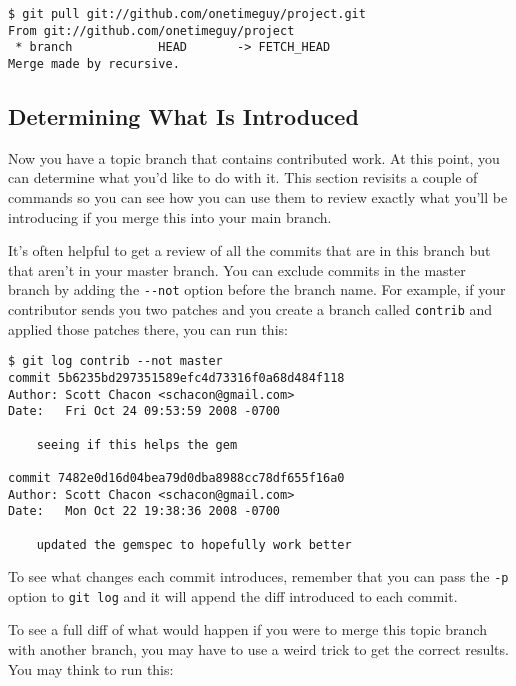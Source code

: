 \documentclass[a4paper]{book}
\begin{document}
\begin{shaded}\begin{verbatim}
$ git pull git://github.com/onetimeguy/project.git
From git://github.com/onetimeguy/project
 * branch            HEAD       -> FETCH_HEAD
Merge made by recursive.
\end{verbatim}\end{shaded}

\subsection{Determining What Is Introduced}

Now you have a topic branch that contains contributed work. At this point, you can determine what you'd like to do with it. This section revisits a couple of commands so you can see how you can use them to review exactly what you'll be introducing if you merge this into your main branch.

It's often helpful to get a review of all the commits that are in this branch but that aren't in your master branch. You can exclude commits in the master branch by adding the \texttt{-{}-not} option before the branch name. For example, if your contributor sends you two patches and you create a branch called \texttt{contrib} and applied those patches there, you can run this:

\begin{shaded}\begin{verbatim}
$ git log contrib --not master
commit 5b6235bd297351589efc4d73316f0a68d484f118
Author: Scott Chacon <schacon@gmail.com>
Date:   Fri Oct 24 09:53:59 2008 -0700

    seeing if this helps the gem

commit 7482e0d16d04bea79d0dba8988cc78df655f16a0
Author: Scott Chacon <schacon@gmail.com>
Date:   Mon Oct 22 19:38:36 2008 -0700

    updated the gemspec to hopefully work better
\end{verbatim}\end{shaded}

To see what changes each commit introduces, remember that you can pass the \texttt{-p} option to \texttt{git log} and it will append the diff introduced to each commit.

To see a full diff of what would happen if you were to merge this topic branch with another branch, you may have to use a weird trick to get the correct results. You may think to run this:
\end{document}
